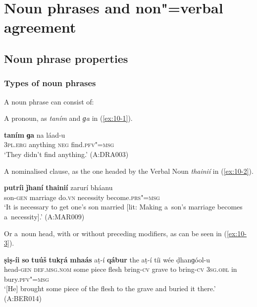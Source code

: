 \chapter{Noun phrases and non"=verbal agreement}
\label{chap:10}


\section{Noun phrase properties}
\label{sec:10-1}

\subsection{Types of noun phrases}
\label{subsec:10-1-1}


A noun phrase can consist of: 


A pronoun, as \textit{taním} and \textit{ɡa} in (\ref{ex:10-1}).

\begin{exe}
\ex
\label{ex:10-1}
\gll \textbf{taním} \textbf{ɡa} na láad-u  \\
\textsc{3pl.erg} anything \textsc{neg} find.\textsc{pfv"=msg} \\
\glt `They didn't find anything.' (A:DRA003)
\end{exe}

A nominalised clause, as the one headed by the Verbal Noun \textit{thainií} in (\ref{ex:10-2}).

\begin{exe}
\ex
\label{ex:10-2}
\gll \textbf{putríi} \textbf{ǰhaní} \textbf{thainií} zarurí bháanu \\
son-\textsc{gen} marriage do.\textsc{vn} necessity become.\textsc{prs"=msg}  \\
\glt `It is necessary to get one's son married [lit: Making a~son's marriage becomes a~necessity].' (A:MAR009)
\end{exe}

Or a~noun head, with or without preceding modifiers, as can be seen in (\ref{ex:10-3}).

\begin{exe}
\ex
\label{ex:10-3}
\gll \textbf{ṣiṣ-íi} \textbf{so} \textbf{tuúš} \textbf{tukṛá} \textbf{mhaás} aṭ-í \textbf{qábur} the aṭ-í tíi wée ḍhanɡóol-u \\
head-\textsc{gen} \textsc{def.msg.nom} some piece flesh bring-\textsc{cv} grave  to bring-\textsc{cv} \textsc{3sg.obl} in bury.\textsc{pfv"=msg}  \\
\glt `[He] brought some piece of the flesh to the grave and buried it there.' (A:BER014)
\end{exe}

